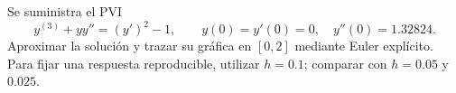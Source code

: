 Se suministra el PVI
\[y^{(3)}+yy''=(y')^2-1,\qquad y(0)=y'(0)=0,\quad y''(0)=1.32824.\]
Aproximar la solución y trazar su gráfica en \([0,2]\) mediante Euler explícito.
Para fijar una respuesta reproducible, utilizar \(h=0.1\); comparar con \(h=0.05\) y \(0.025\).
